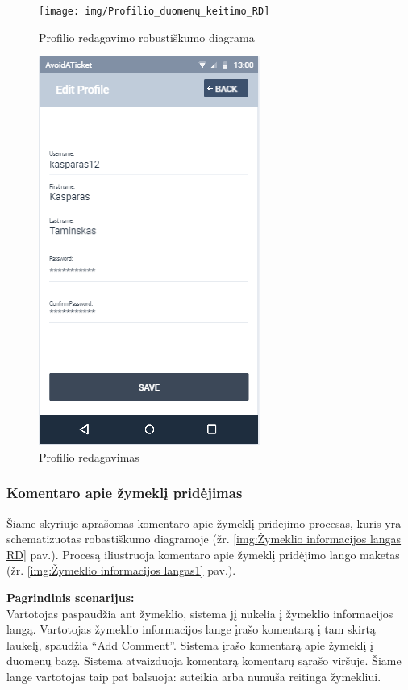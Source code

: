 \documentclass{VUMIFPSkursinis}
\begin{document}
		\begin{figure}[H]
				\centering
				\texttt{[image: img/Profilio\_duomenų\_keitimo\_RD]}
				\caption{Profilio redagavimo robustiškumo diagrama}
				\label{img:profilio redagavimas RD}
			\end{figure}
	\begin{figure}[H]
				\centering
				\includegraphics[scale=0.55]{img/mockup_profileedit}
				\caption{Profilio redagavimas}
				\label{img:profilio redagavimas}
			\end{figure}

\subsubsection{Komentaro apie žymeklį pridėjimas}
	Šiame skyriuje aprašomas komentaro apie žymeklį pridėjimo procesas, kuris yra schematizuotas robastiškumo diagramoje (žr. \ref{img:Žymeklio informacijos langas RD} pav.). 
	Procesą iliustruoja komentaro apie žymeklį pridėjimo lango maketas (žr. \ref{img:Žymeklio informacijos langas1} pav.).

	\textbf{Pagrindinis scenarijus:}\\
    Vartotojas paspaudžia ant žymeklio, sistema jį nukelia į žymeklio informacijos langą. Vartotojas žymeklio informacijos lange įrašo komentarą į tam skirtą laukelį, spaudžia “Add Comment”. Sistema įrašo komentarą apie žymeklį į duomenų bazę. Sistema atvaizduoja komentarą komentarų sąrašo viršuje. Šiame lange vartotojas taip pat balsuoja: suteikia arba numuša reitinga žymekliui.
\end{document}
